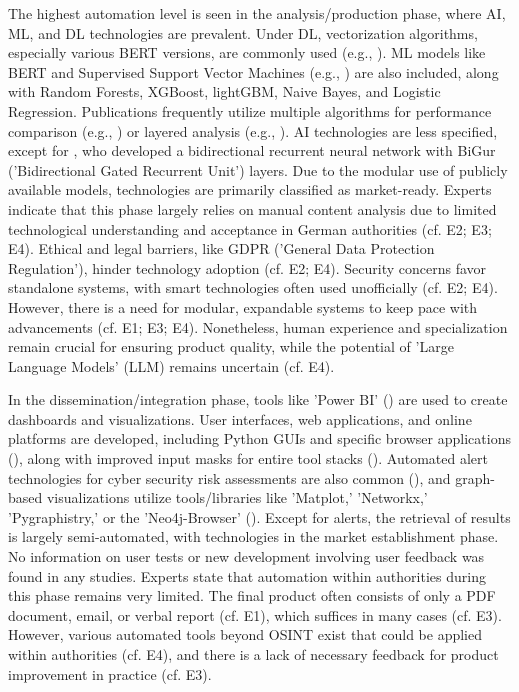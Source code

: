\documentclass[10pt]{article}
\begin{document}
The highest automation level is seen in the analysis/production phase, where AI, ML, and DL technologies are prevalent. Under DL, vectorization algorithms, especially various BERT versions, are commonly used (e.g., \cite{Ma.2022}). ML models like BERT and Supervised Support Vector Machines (e.g., \cite{Iorga.2020}) are also included, along with Random Forests, XGBoost, lightGBM, Naive Bayes, and Logistic Regression. Publications frequently utilize multiple algorithms for performance comparison (e.g., \cite{Tao.2023}) or layered analysis (e.g., \cite{Yang.2022}). AI technologies are less specified, except for \textcite{Dale.2023}, who developed a bidirectional recurrent neural network with BiGur ('Bidirectional Gated Recurrent Unit') layers. Due to the modular use of publicly available models, technologies are primarily classified as market-ready. Experts indicate that this phase largely relies on manual content analysis due to limited technological understanding and acceptance in German authorities (cf. E2; E3; E4). Ethical and legal barriers, like GDPR ('General Data Protection Regulation'), hinder technology adoption (cf. E2; E4). Security concerns favor standalone systems, with smart technologies often used unofficially (cf. E2; E4). However, there is a need for modular, expandable systems to keep pace with advancements (cf. E1; E3; E4). Nonetheless, human experience and specialization remain crucial for ensuring product quality, while the potential of 'Large Language Models' (LLM) remains uncertain (cf. E4).

In the dissemination/integration phase, tools like 'Power BI' (\cite{Tao.2023}) are used to create dashboards and visualizations. User interfaces, web applications, and online platforms are developed, including Python GUIs and specific browser applications (\cite{Elmas.2022}), along with improved input masks for entire tool stacks (\cite{Arjun.2020}). Automated alert technologies for cyber security risk assessments are also common (\cite{Ahuja.2022}), and graph-based visualizations utilize tools/libraries like 'Matplot,' 'Networkx,' 'Pygraphistry,' or the 'Neo4j-Browser' (\cite{Middleton.2020}). Except for alerts, the retrieval of results is largely semi-automated, with technologies in the market establishment phase. No information on user tests or new development involving user feedback was found in any studies. Experts state that automation within authorities during this phase remains very limited. The final product often consists of only a PDF document, email, or verbal report (cf. E1), which suffices in many cases (cf. E3). However, various automated tools beyond OSINT exist that could be applied within authorities (cf. E4), and there is a lack of necessary feedback for product improvement in practice (cf. E3).
\end{document}
